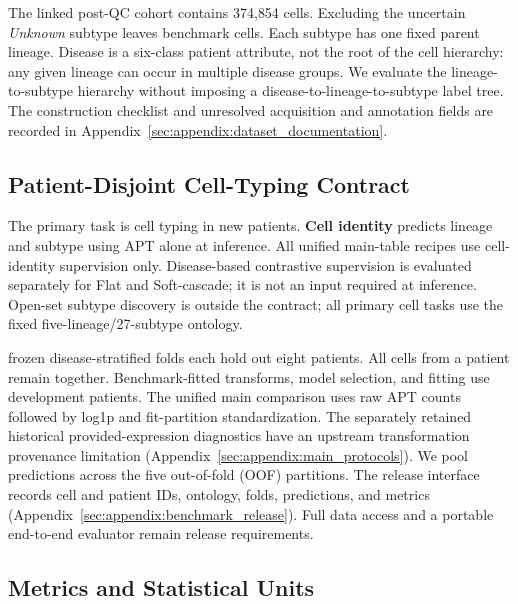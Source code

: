 The linked post-QC cohort contains 374{,}854 cells. Excluding the uncertain
\emph{Unknown} subtype leaves \numcells{} benchmark cells. Each subtype has one
fixed parent lineage. Disease is a six-class patient attribute, not the root of
the cell hierarchy: any given lineage can occur in multiple disease groups.
We evaluate the lineage-to-subtype hierarchy without imposing a
disease-to-lineage-to-subtype label tree. The construction checklist and
unresolved acquisition and annotation fields are recorded in
Appendix~\ref{sec:appendix:dataset_documentation}.

\subsection{Patient-Disjoint Cell-Typing Contract}
\label{sec:data:contract}
\label{sec:data:protocols}

The primary task is cell typing in new patients.
\textbf{Cell identity} predicts lineage and subtype using APT alone at inference.
All unified main-table recipes use cell-identity supervision only.
Disease-based contrastive supervision is evaluated separately for Flat and
Soft-cascade; it is not an input required at inference.
Open-set subtype discovery is outside the contract; all primary cell tasks
use the fixed five-lineage/27-subtype ontology.

\numfolds{} frozen disease-stratified folds each hold out eight patients. All cells
from a patient remain together. Benchmark-fitted transforms, model selection,
and fitting use development patients. The unified main comparison uses raw
APT counts followed by log1p and fit-partition standardization. The separately
retained historical provided-expression diagnostics have an upstream
transformation provenance limitation
(Appendix~\ref{sec:appendix:main_protocols}). We pool predictions across the five
out-of-fold (OOF) partitions. The release
interface records cell and patient IDs, ontology, folds, predictions, and
metrics (Appendix~\ref{sec:appendix:benchmark_release}). Full data access and a
portable end-to-end evaluator remain release requirements.

\subsection{Metrics and Statistical Units}
\label{sec:data:imbalance}

